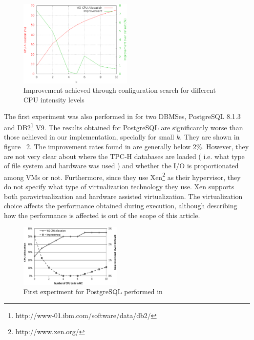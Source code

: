 \documentclass[jidm,a4paper]{jidm} %
\begin{document}
\begin{figure}[t]
 \centering
 \includegraphics[width=0.5\textwidth]{improvement.eps}
 \caption{Improvement achieved through configuration search for different CPU intensity levels}
 \label{fig:intensity}
\end{figure} 

The first experiment was also performed in \cite{Soror:2008:AVM:1376616.1376711} for two DBMSes, PostgreSQL 8.1.3 and DB2\footnote{http://www-01.ibm.com/software/data/db2/} V9.  The results obtained for PostgreSQL are significantly worse than those achieved in our implementation, specially for small $k$. They are shown in figure ~\ref{fig:cpuvar-psql}. The improvement rates found in \cite{Soror:2008:AVM:1376616.1376711} are generally below $2\%$. However, they are not very clear about where the TPC-H databases are loaded ( i.e. what type of file system and hardware was used ) and whether the I/O is proportionated among VMs or not. Furthermore, since they use Xen\footnote{http://www.xen.org/} as their hypervisor, they do not specify what type of virtualization technology they use. Xen supports both paravirtualization and hardware assisted virtualization. The virtualization choice affects the performance obtained during execution, although describing how the performance is affected is out of the scope of this 
article.

\begin{figure}[t]
 \centering
 \includegraphics[width=0.45\textwidth]{CPU-var-psql.eps}
 \caption{First experiment for PostgreSQL performed in \protect\cite{Soror:2008:AVM:1376616.1376711}  }
 \label{fig:cpuvar-psql}
\end{figure} 
\end{document}
